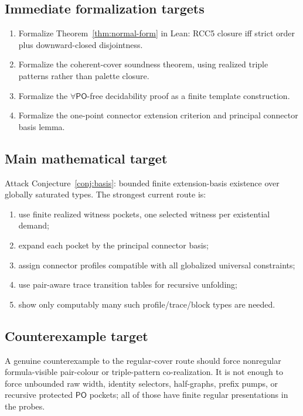 \documentclass[11pt]{article}
\newcommand{\PO}{\mathsf{PO}}
\begin{document}
\subsection{Immediate formalization targets}
\begin{enumerate}
\item Formalize Theorem~\ref{thm:normal-form} in Lean: RCC5 closure iff strict order plus downward-closed disjointness.
\item Formalize the coherent-cover soundness theorem, using realized triple patterns rather than palette closure.
\item Formalize the $\forall\PO$-free decidability proof as a finite template construction.
\item Formalize the one-point connector extension criterion and principal connector basis lemma.
\end{enumerate}

\subsection{Main mathematical target}
Attack Conjecture~\ref{conj:basis}: bounded finite extension-basis existence over globally saturated types.  The strongest current route is:
\begin{enumerate}
\item use finite realized witness pockets, one selected witness per existential demand;
\item expand each pocket by the principal connector basis;
\item assign connector profiles compatible with all globalized universal constraints;
\item use pair-aware trace transition tables for recursive unfolding;
\item show only computably many such profile/trace/block types are needed.
\end{enumerate}

\subsection{Counterexample target}
A genuine counterexample to the regular-cover route should force nonregular formula-visible pair-colour or triple-pattern co-realization.  It is not enough to force unbounded raw width, identity selectors, half-graphs, prefix pumps, or recursive protected $\PO$ pockets; all of those have finite regular presentations in the probes.
\end{document}
